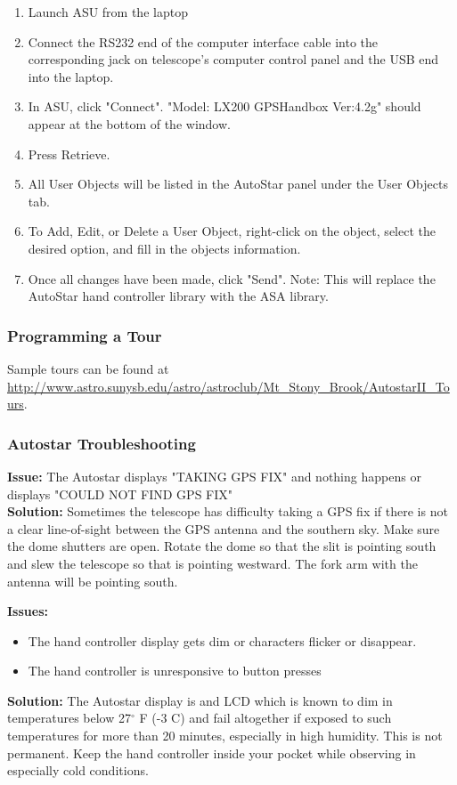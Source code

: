 \documentclass[12pt,titlepage]{article}
\renewcommand\deg{\mbox{$^\circ$}}
\begin{document}
\begin{enumerate}
	\item Launch ASU from the laptop
	\item Connect the RS232 end of the computer interface cable into the corresponding jack on telescope's computer control panel and the USB end into the laptop.
	\item In ASU, click "Connect". "Model: LX200 GPS\quad Handbox Ver:4.2g" should appear at the bottom of the window.
	\item Press Retrieve.
	\item All User Objects will be listed in the AutoStar panel under the User Objects tab.
	\item To Add, Edit, or Delete a User Object, right-click on the object, select the desired option, and fill in the objects information.
	\item Once all changes have been made, click "Send". Note: This will replace the AutoStar hand controller library with the ASA library.
\end{enumerate}

\subsubsection{Programming a Tour}
Sample tours can be found at \url{http://www.astro.sunysb.edu/astro/astroclub/Mt_Stony_Brook/AutostarII_Tours}.

\subsubsection{Autostar Troubleshooting}
\textbf{\flushleft Issue:} The Autostar displays "TAKING GPS FIX" and nothing happens or displays "COULD NOT FIND GPS FIX"\\
\textbf{Solution:} Sometimes the telescope has difficulty taking a GPS fix if there is not a clear line-of-sight between the GPS antenna and the southern sky. Make sure the dome shutters are open. Rotate the dome so that the slit is pointing south and slew the telescope so that is pointing westward. The fork arm with the antenna will be pointing south. 

\textbf{\flushleft Issues:}
\begin{itemize}
	\item The hand controller display gets dim or characters flicker or disappear.
	\item The hand controller is unresponsive to button presses
\end{itemize}
\textbf{Solution:} The Autostar display is and LCD which is known to dim in temperatures below 27$\deg$ F (-3 C) and fail altogether if exposed to such temperatures for more than 20 minutes, especially in high humidity. This is not permanent. Keep the hand controller inside your pocket while observing in especially cold conditions.
\end{document}
